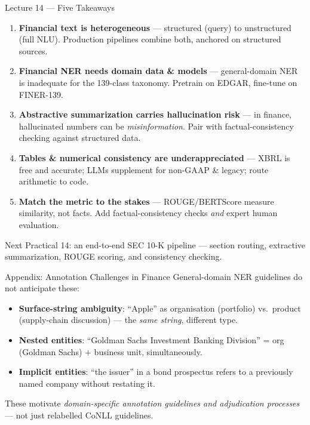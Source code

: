 \documentclass[9pt,t]{beamer}
\begin{document}
\begin{frame}{Lecture 14 --- Five Takeaways}
\begin{enumerate}
  \item \textbf{Financial text is heterogeneous} --- structured (query) to
        unstructured (full NLU). Production pipelines combine both, anchored on
        structured sources.
  \item \textbf{Financial NER needs domain data \& models} --- general-domain NER
        is inadequate for the 139-class taxonomy. Pretrain on EDGAR, fine-tune on
        FINER-139.
  \item \textbf{Abstractive summarization carries hallucination risk} --- in
        finance, hallucinated numbers can be \emph{misinformation}. Pair with
        factual-consistency checking against structured data.
  \item \textbf{Tables \& numerical consistency are underappreciated} --- XBRL is
        free and accurate; LLMs supplement for non-GAAP \& legacy; route arithmetic
        to code.
  \item \textbf{Match the metric to the stakes} --- ROUGE/BERTScore measure
        similarity, not facts. Add factual-consistency checks \emph{and} expert
        human evaluation.
\end{enumerate}
\begin{block}{Next}
Practical 14: an end-to-end SEC 10-K pipeline --- section routing, extractive
summarization, ROUGE scoring, and consistency checking.
\end{block}
\end{frame}


\begin{frame}[noframenumbering]{Appendix: Annotation Challenges in Finance}
General-domain NER guidelines do not anticipate these:
\begin{itemize}
  \item \textbf{Surface-string ambiguity}: ``Apple'' as organisation (portfolio)
        vs.\ product (supply-chain discussion) --- the \emph{same string}, different type.
  \item \textbf{Nested entities}: ``Goldman Sachs Investment Banking Division'' =
        org (Goldman Sachs) $+$ business unit, simultaneously.
  \item \textbf{Implicit entities}: ``the issuer'' in a bond prospectus refers to a
        previously named company without restating it.
\end{itemize}
\medskip
These motivate \emph{domain-specific annotation guidelines and adjudication
processes} --- not just relabelled CoNLL guidelines.
\end{frame}
\end{document}
